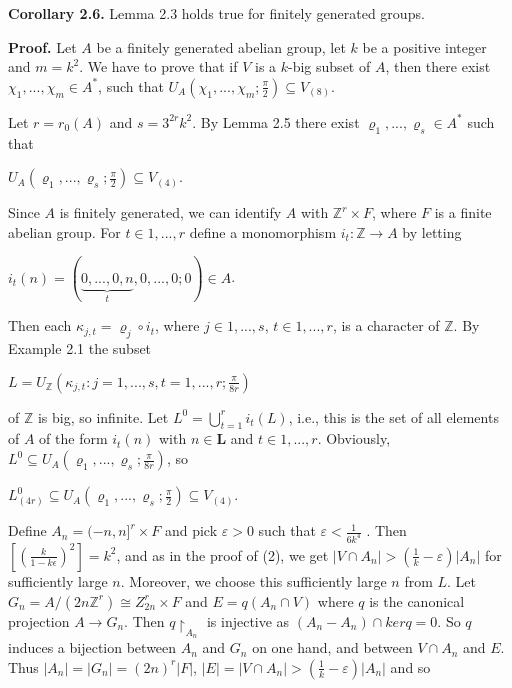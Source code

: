 \documentclass[12pt]{article}
\begin{document}
    \textbf{Corollary 2.6.} Lemma 2.3 holds true for finitely generated groups.


    \textbf{Proof.} Let $A$ be a finitely generated abelian group, let $k$ be a positive integer and $m = k^2$. We have to prove that if $V$ is a
    $k$-big subset of $A$, then there exist $\chi_1,...,\chi_m \in A^*$, such that $U_A(\chi_1,...,\chi_m; \frac{\pi}{2} ) \subseteq V_{(8)}$.


    Let $r = r_0 (A)$ and $s = 3^{2r}k^2$. By Lemma 2.5 there exist $\varrho_1,...,\varrho_s \in A^*$ such that


        $U_A (\varrho_1,...,\varrho_s; \frac{\pi}{2}) \subseteq V_{(4)}$.


    Since $A$ is finitely generated, we can identify $A$ with $\mathbb{Z}^r \times F$, where $F$ is a finite abelian group. For $t \in {1,...,r}$ define a
    monomorphism $i_t : \mathbb{Z} \to A$ by letting


    $i_t (n) = (\underbrace{0,..., 0,n}_{t}, 0,..., 0; 0) \in A$.
    

    Then each $κ_{j,t} = \varrho_j \circ i_t$, where $j \in {1,..., s}$, $t \in {1,...,r}$, is a character of $\mathbb{Z}$. By Example 2.1 the subset


        $L = U_{\mathbb{Z}} ({κ_{j,t}: j = 1,..., s, t = 1,...,r}; \frac{\pi}{8r})$

    
    of $\mathbb{Z}$ is big, so infinite. Let $L^0 = \bigcup^{r}_{t=1} i_t (L)$, i.e., this is the set of all elements of $A$ of the form $i_t (n)$ with $n \in \mathbf{L}$ and
    $t \in {1,...,r}$. Obviously, $L^0 \subseteq U_A(\varrho_1,...,\varrho_s; \frac{\pi}{8r} )$, so


        $L^0_{(4r)} \subseteq U_A(\varrho_1,...,\varrho_s; \frac{\pi}{2}) \subseteq V_{(4)}$.


    Define $A_n = (-n,n]^r \times F$ and pick $\varepsilon > 0$ such that $\varepsilon < \frac{1}{6k^4}$ . Then $[( \frac{k}{1-k\epsilon} )^2] = k^2$, and as in the proof of (2), we get
    $|V \cap A_n| > ( \frac{1}{k} - \varepsilon)|A_n|$ for sufficiently large $n$. Moreover, we choose this sufficiently large $n$ from $L$. Let
    $G_n = A/(2n \mathbb{Z}^r) \cong Z^r_{2n} \times F$ and $E = q(A_n \cap V)$ where $q$ is the canonical projection $A \to G_n$. Then $q\upharpoonright_{A_n}$ is injective as $(A_n - A_n) \cap ker q = 0$.
    So $q$ induces a bijection between $A_n$ and $G_n$ on one hand, and between $V \cap A_n$ and $E$. Thus $|A_n|=|G_n| = (2n)^r|F|$, $|E| =|V \cap A_n| > ( \frac{1}{k} - \varepsilon)|A_n|$ and so
\end{document}
